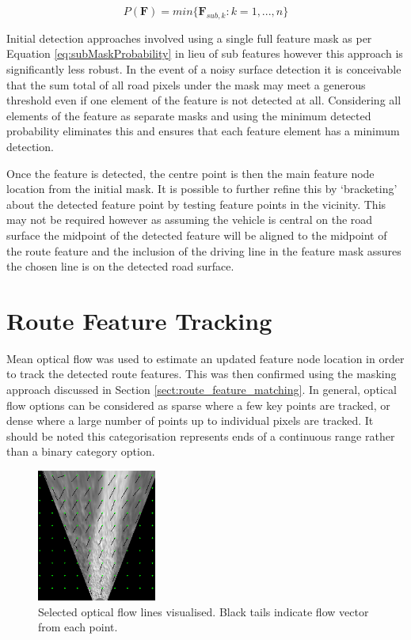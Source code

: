 \documentclass[]{aiaa-tc}%
\begin{document}
\begin{equation}\label{eq:featureProbability}
	P(\textbf{F}) = min\{\textbf{F}_{sub,k}:k=1,...,n\}
\end{equation}

Initial detection approaches involved using a single full feature mask as per Equation \ref{eq:subMaskProbability} in lieu of sub features however this approach is significantly less robust. In the event of a noisy surface detection it is conceivable that the sum total of all road pixels under the mask may meet a generous threshold even if one element of the feature is not detected at all. Considering all elements of the feature as separate masks and using the minimum detected probability eliminates this and ensures that each feature element has a minimum detection. 

Once the feature is detected, the centre point is then the main feature node location from the initial mask. It is possible to further refine this by `bracketing' about the detected feature point by testing feature points in the vicinity. This may not be required however as assuming the vehicle is central on the road surface the midpoint of the detected feature will be aligned to the midpoint of the route feature and the inclusion of the driving line in the feature mask assures the chosen line is on the detected road surface.

\section{Route Feature Tracking}\label{s:roadFeatureTracking}

Mean optical flow was used to estimate an updated feature node location in order to track the detected route features. This was then confirmed using the masking approach discussed in Section \ref{sect:route_feature_matching}. In general, optical flow options can be considered as sparse where a few key points are tracked, or dense where a large number of points up to individual pixels are tracked. It should be noted this categorisation represents ends of a continuous range rather than a binary category option. 

\begin{figure} %
	\centering
	\includegraphics[width=0.35\textwidth]{FeatureTracking/optical_flow_trails.png}
	\caption{Selected optical flow lines visualised. Black tails indicate flow vector from each point.}
	\label{f:optical_flow_trails}
\end{figure}
\end{document}
